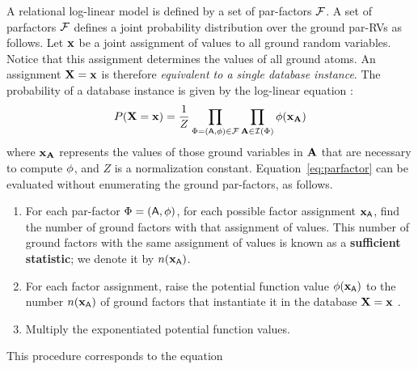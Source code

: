 A relational log-linear model is defined by a set of par-factors $\mathcal{F}$. 
A set of parfactors $\mathcal{F}$ defines a joint probability distribution over the ground par-RVs as follows. Let $\mathbf{x}$ be a joint assignment of values to all ground random variables. Notice that this assignment determines the values of all ground atoms. An assignment $\mathbf{X}=\mathbf{x}$ is therefore {\em equivalent to a single database instance}.
The probability of a database instance is given by the log-linear equation \cite[Eq.7]{Kimmig2015}:
\begin{equation} \label{eq:parfactor}
P(\mathbf{X}=\mathbf{x}) = \frac{1}{Z} \prod_{\Phi = (\mathsf{A},\phi) \in \mathcal{F}} \prod_{\mathbf{A} \in \mathcal{I}(\Phi)} 
\phi(\mathbf{x}_{\mathbf{A}}) 
\end{equation}
where $\mathbf{x}_{\mathbf{A}}$ represents the values of those ground variables in $\mathbf{A}$ that are necessary to compute $\phi$, and $Z$ is a normalization constant.
Equation~\ref{eq:parfactor} can be evaluated without enumerating the ground par-factors, 
as follows. 
%
%

\begin{enumerate}
\item For each par-factor $\Phi = (\mathsf{A},\phi)$, for each possible factor assignment $\mathbf{x}_{\mathsf{A}}$, find the number of ground factors with that assignment of values.  This number of ground factors with the same assignment of values is known as a \textbf{sufficient statistic}; we denote it by $n(\mathbf{x}_{\mathsf{A}})$. 
\item For each factor assignment, raise the potential function value $\phi(\mathbf{x}_{\mathsf{A}})$  to the number $n(\mathbf{x}_{\mathsf{A}})$ of ground factors that instantiate it in the database %
$\mathbf{X}=\mathbf{x}$ . 
\item Multiply the exponentiated potential function values.  
\end{enumerate}

This procedure corresponds to the equation 

